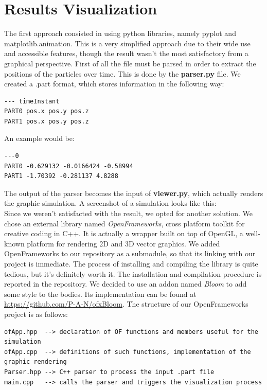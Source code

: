 \documentclass{article}
\begin{document}
\section{Results Visualization}
The first approach consisted in using python libraries, namely pyplot and matplotlib.animation. This is a very simplified approach due to their wide use and accessible features, though the result wasn't the most satisfactory from a graphical perspective. First of all the file must be parsed in order to extract the positions of the particles over time. This is done by the \textbf{parser.py} file. We created a .part format, which stores information in the following way: \\
\begin{verbatim}
--- timeInstant
PART0 pos.x pos.y pos.z
PART1 pos.x pos.y pos.z
\end{verbatim}
An example would be:
\begin{verbatim}
---0
PART0 -0.629132 -0.0166424 -0.58994
PART1 -1.70392 -0.281137 4.8288
\end{verbatim}

\noindent The output of the parser becomes the input of \textbf{viewer.py}, which actually renders the graphic simulation. 
A screenshot of a simulation looks like this: \\
        
Since we weren't satisfacted with the result, we opted for another solution. We chose an external library named \textit{OpenFrameworks}, cross platform toolkit for creative coding in C++. It is actually a wrapper built on top of OpenGL, a well-known platform for rendering 2D and 3D vector graphics. We added OpenFrameworks to our repository as a submodule, so that its linking with our project is immediate. The process of installing and compiling the library is quite tedious, but it's definitely worth it. The installation and compilation procedure is reported in the repository. We decided to use an addon named \textit{Bloom} to add some style to the bodies. Its implementation can be found at \url{https://github.com/P-A-N/ofxBloom}. The structure of our OpenFrameworks project is as follows:
\begin{verbatim}
ofApp.hpp  --> declaration of OF functions and members useful for the simulation
ofApp.cpp  --> definitions of such functions, implementation of the graphic rendering
Parser.hpp --> C++ parser to process the input .part file
main.cpp   --> calls the parser and triggers the visualization process 
\end{verbatim}
\end{document}
